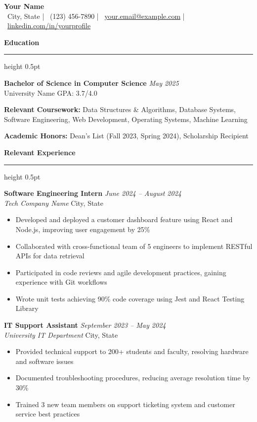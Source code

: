 \documentclass[11pt,letterpaper]{article}
\newcommand{\resumesection}[1]{
    \vspace{0.5em}
    {\color{accentcolor}\textbf{\large #1}}
    \vspace{0.15em}
    {\color{accentcolor}\hrule height 0.5pt}
    \vspace{0.3em}
}
\newcommand{\experienceentry}[4]{
    \textbf{#1} \hfill \textit{#2} \\
    \textit{#3} \hfill #4
    \vspace{0.1em}
}
\newcommand{\educationentry}[4]{
    \textbf{#1} \hfill \textit{#2} \\
    #3 \hfill #4
    \vspace{0.1em}
}
\begin{document}
\begin{center}
    {\LARGE\textbf{Your Name}} \\
    \vspace{0.3em}
    \faMapMarker*\ City, State | \faPhone*\ (123) 456-7890 | \faEnvelope\ \href{mailto:your.email@example.com}{your.email@example.com} | \faLinkedin\ \href{https://linkedin.com/in/yourprofile}{linkedin.com/in/yourprofile}
\end{center}

\vspace{0.5em}

\resumesection{Education}

\educationentry{Bachelor of Science in Computer Science}{May 2025}{University Name}{GPA: 3.7/4.0}

\textbf{Relevant Coursework:} Data Structures \& Algorithms, Database Systems, Software Engineering, Web Development, Operating Systems, Machine Learning

\textbf{Academic Honors:} Dean's List (Fall 2023, Spring 2024), Scholarship Recipient

\vspace{0.3em}

\resumesection{Relevant Experience}

\experienceentry{Software Engineering Intern}{June 2024 -- August 2024}{Tech Company Name}{City, State}
\begin{itemize}
    \item Developed and deployed a customer dashboard feature using React and Node.js, improving user engagement by 25\%
    \item Collaborated with cross-functional team of 5 engineers to implement RESTful APIs for data retrieval
    \item Participated in code reviews and agile development practices, gaining experience with Git workflows
    \item Wrote unit tests achieving 90\% code coverage using Jest and React Testing Library
\end{itemize}

\vspace{0.2em}

\experienceentry{IT Support Assistant}{September 2023 -- May 2024}{University IT Department}{City, State}
\begin{itemize}
    \item Provided technical support to 200+ students and faculty, resolving hardware and software issues
    \item Documented troubleshooting procedures, reducing average resolution time by 30\%
    \item Trained 3 new team members on support ticketing system and customer service best practices
\end{itemize}
\end{document}
